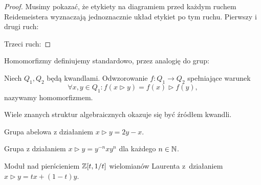 \begin{proof}
    Musimy pokazać, że etykiety na diagramiem przed każdym ruchem Reidemeistera wyznaczają jednoznacznie układ etykiet po tym ruchu.
    Pierwszy i drugi ruch:
\begin{comment}
    \begin{figure}[H]
        \begin{minipage}[b]{.48\linewidth}
        \[
            \LargeReidemeisterOneRightQuandleProof
            \stackrel{R_1}{\cong}
            \LargeReidemeisterOneStraightQuandleProof
        \]
        \end{minipage}
        \begin{minipage}[b]{.48\linewidth}
        \[
            \LargeReidemeisterTwoQuandleA \cong \LargeReidemeisterTwoQuandleB
        \]
        \end{minipage}
    \end{figure}
\end{comment}
    Trzeci ruch:
\begin{comment}
    \[
        \LargeReidemeisterThreeQuandleA \cong \LargeReidemeisterThreeQuandleB \qedhere
    \]
\end{comment}
\end{proof}

Homomorfizmy definiujemy standardowo, przez analogię do grup:

\begin{definition}
    Niech $Q_1, Q_2$ będą kwandlami.
    Odwzorowanie $f \colon Q_1 \to Q_2$ spełniające warunek
    \begin{equation}
        \forall x, y \in Q_1 : f(x \triangleright y) = f(x) \triangleright f(y),
    \end{equation}
    nazywamy homomorfizmem.
\end{definition}

Wiele znanych struktur algebraicznych okazuje się być źródłem kwandli.

\begin{example}
%
%
    Grupa abelowa z działaniem $x \triangleright y = 2y - x$.
\end{example}

\begin{example}
%
    Grupa z działaniem $x \triangleright y = y^{-n} x y^n$ dla każdego $n \in \mathbb N$.
\end{example}

\begin{example}
%
    Moduł nad pierścieniem $\mathbb Z[t, 1/t]$ wielomianów Laurenta z~działaniem $x \triangleright y = tx + (1-t) y$.
\end{example}

